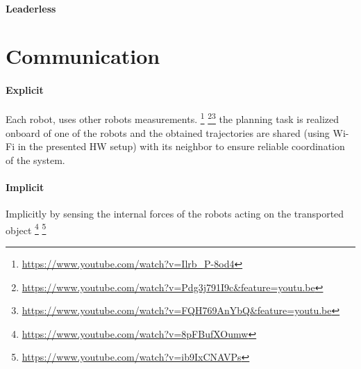 \documentclass{article}
\begin{document}
		\paragraph{Leaderless}
			\cite{mohammadi-2018-decentralized-motion-control-in-a-cabled-based-multi-drone-load-transport-system,mohammadi-2020-control-of-multiple-quad-copters-with-a-cable-suspended-payload-subject-to-disturbances}
			\cite{rezaee-2017-almost-sure-attitude-consensus-in-multispacecraft-systems-with-stochastic-communication-links}
	\section{Communication}
		\paragraph{Explicit} Each robot, uses other robots measurements.
			\cite{loianno-2017-cooperative-transportation-using-small-quadrotors-using-monocular-vision-and-inertial-sensing}\footnote{\url{https://www.youtube.com/watch?v=Ilrb_P-8od4}}
			\cite{masone-2016-cooperative-transportation-of-a-payload-using-quadrotors-a-reconfigurable-cable-driven-parallel-robot}
			\cite{spurny-2019-cooperative-transport-of-large-objects-by-a-pair-of-unmanned-aerial-systems-using-sampling-based-motion-planning}\footnote{\url{https://www.youtube.com/watch?v=Pdg3j791I9c&feature=youtu.be}}\footnote{\url{https://www.youtube.com/watch?v=FQH769AnYbQ&feature=youtu.be}} the planning task is realized onboard of one of the robots and the obtained trajectories are shared (using Wi-Fi in the presented HW setup) with its neighbor to ensure reliable coordination of the system.
			
		\paragraph{Implicit} Implicitly by sensing the internal forces of the robots acting on the transported object
			\cite{tagliabue-2017-robust-collaborative-object-transportation-using-multiple-mavs}
			\cite{tagliabue-2017-collaborative-transportation-using-mavs-via-passive-force-control}
			\cite{gassner-2017-dynamic-collaboration-without-communication-vision-based-cable-suspended-load-transport-with-two-quadrotors}\footnote{\url{https://www.youtube.com/watch?v=8pFBufXOumw}}
			\cite{wu-2020-cooperative-transportation-of-drones-without-inter-agent-communication} \footnote{\url{https://www.youtube.com/watch?v=ib9IxCNAVPs}}
			\cite{thapa-2019-cooperative-aerial-load-transport-with-attitude-stabilization}
\end{document}
